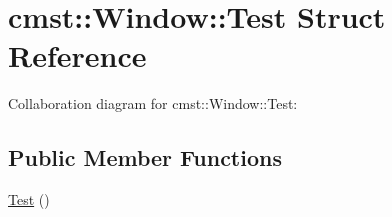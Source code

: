 \hypertarget{structcmst_1_1_window_1_1_test}{}\section{cmst::Window::Test Struct Reference}
\label{structcmst_1_1_window_1_1_test}


Collaboration diagram for cmst::Window::Test:
\subsection*{Public Member Functions}
\begin{DoxyCompactItemize}
\item 
\hyperlink{structcmst_1_1_window_1_1_test_af1e9b5fcdbaa7d5ba758571e06e41952}{Test} ()
\end{DoxyCompactItemize}
